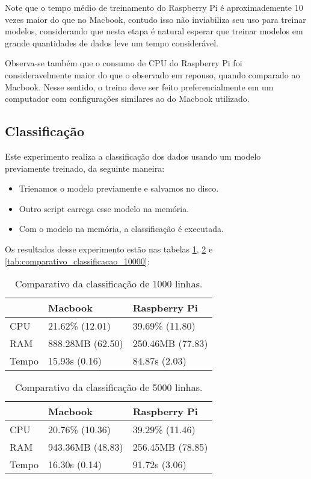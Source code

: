 Note que o tempo médio de treinamento do Raspberry Pi é aproximademente 10 vezes maior do que no Macbook,
contudo isso não inviabiliza seu uso para treinar modelos, considerando que nesta etapa é natural
esperar que treinar modelos em grande quantidades de dados leve um tempo considerável.

Observa-se também que o consumo de CPU do Raspberry Pi foi consideravelmente maior do que o observado 
em repouso, quando comparado ao Macbook. Nesse sentido, o treino deve ser feito preferencialmente 
em um computador com configurações similares ao do Macbook utilizado.


\subsection{Classificação}

Este experimento realiza a classificação dos dados usando um modelo previamente treinado, 
da seguinte maneira:

\begin{itemize}
    \item Trienamos o modelo previamente e salvamos no disco.
    \item Outro script carrega esse modelo na memória. 
    \item Com o modelo na memória, a classificação é executada.
\end{itemize}


Os resultados desse experimento estão nas tabelas \ref{tab:comparativo_classificacao_1000}, 
\ref{tab:comparativo_classificacao_5000} e \ref{tab:comparativo_classificacao_10000}:


\begin{table}[!ht]
    \centering
    \begin{tabular}{|l|l|l|}
    \hline
        ~ & Macbook & Raspberry Pi \\ \hline
        CPU & 21.62\% (12.01) & 39.69\% (11.80) \\ \hline
        RAM & 888.28MB (62.50) & 250.46MB (77.83) \\ \hline
        Tempo & 15.93s (0.16) & 84.87s (2.03) \\ \hline
    \end{tabular}

    \caption{Comparativo da classificação de 1000 linhas.\label{tab:comparativo_classificacao_1000}}
\end{table}


\begin{table}[!ht]
    \centering
    \begin{tabular}{|l|l|l|}
    \hline
        ~ & Macbook & Raspberry Pi \\ \hline
        CPU & 20.76\% (10.36) & 39.29\% (11.46) \\ \hline
        RAM & 943.36MB (48.83) & 256.45MB (78.85) \\ \hline
        Tempo & 16.30s (0.14) & 91.72s (3.06) \\ \hline
    \end{tabular}

    \caption{Comparativo da classificação de 5000 linhas.\label{tab:comparativo_classificacao_5000}}
\end{table}


